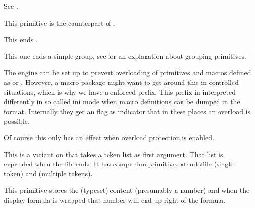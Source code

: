 See .

\stopnewprimitive

\startnewprimitive[title={\prm {endmathgroup}}]

This primitive is the counterpart of .

\stopnewprimitive

\startnewprimitive[title={\prm {endmvl}}]

This ends .

\stopnewprimitive

\startnewprimitive[title={\prm {endsimplegroup}}]

This one ends a simple group, see  for an explanation
about grouping primitives.

\stopnewprimitive

\startnewprimitive[title={\prm {enforced}}]

The engine can be set up to prevent overloading of primitives and macros defined
as  or . However, a macro package might want
to get around this in controlled situations, which is why we have a \prm
{enforced} prefix. This prefix in interpreted differently in so called \quote
{ini} mode when macro definitions can be dumped in the format. Internally they
get an  flag as indicator that in these places an overload is
possible.

\starttyping
\permanent{}

\def\oof         {\def\foo{fails}}
\def\oof{\enforced\def\foo{succeeds}}
\stoptyping

Of course this only has an effect when overload protection is enabled.

\stopnewprimitive

\startoldprimitive[title={\prm {eofinput}}]

This is a variant on  that takes a token list as first argument. That
list is expanded when the file ends. It has companion primitives \prm
{atendoffile} (single token) and  (multiple tokens).

\stopoldprimitive

\startoldprimitive[title={\prm {eqno}}]

This primitive stores the (typeset) content (presumably a number) and when the
display formula is wrapped that number will end up right of the formula.

\stopoldprimitive

